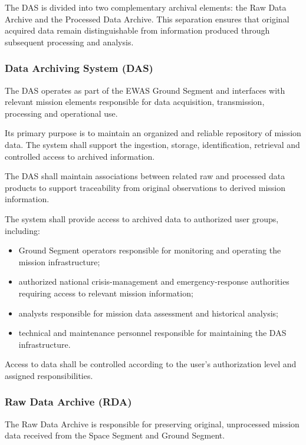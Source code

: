 The DAS is divided into two complementary archival elements: the Raw Data Archive and the Processed Data Archive. This separation ensures that original acquired data remain distinguishable from information produced through subsequent processing and analysis.

\subsubsection*{Data Archiving System (DAS)}

The DAS operates as part of the EWAS Ground Segment and interfaces with relevant mission elements responsible for data acquisition, transmission, processing and operational use.

Its primary purpose is to maintain an organized and reliable repository of mission data. The system shall support the ingestion, storage, identification, retrieval and controlled access to archived information.

The DAS shall maintain associations between related raw and processed data products to support traceability from original observations to derived mission information.

The system shall provide access to archived data to authorized user groups, including:

\begin{itemize}
    \item Ground Segment operators responsible for monitoring and operating the mission infrastructure;
    \item authorized national crisis-management and emergency-response authorities requiring access to relevant mission information;
    \item analysts responsible for mission data assessment and historical analysis;
    \item technical and maintenance personnel responsible for maintaining the DAS infrastructure.
\end{itemize}

Access to data shall be controlled according to the user's authorization level and assigned responsibilities.

\subsubsection*{Raw Data Archive (RDA)}

The Raw Data Archive is responsible for preserving original, unprocessed mission data received from the Space Segment and Ground Segment.

